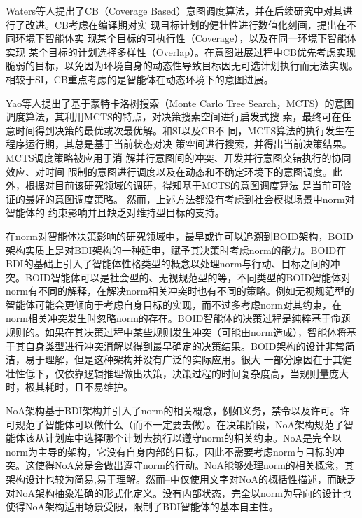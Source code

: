 Waters等人提出了CB（Coverage Based）意图调度算法\cite{DBLP:conf/atal/WatersPS14,DBLP:conf/aamas/ThangarajahSP12}，并在后续研究中对其进行了改进\cite{DBLP:journals/aamas/WatersPS15}。CB考虑在编译期对实 现目标计划的健壮性进行数值化刻画，提出在不同环境下智能体实 现某个目标的可执行性（Coverage），以及在同一环境下智能体实现 某个目标的计划选择多样性（Overlap）。在意图进展过程中CB优先考虑实现脆弱的目标，以免因为环境自身的动态性导致目标因无可选计划执行而无法实现。相较于SI，CB重点考虑的是智能体在动态环境下的意图进展。

Yao等人提出了基于蒙特卡洛树搜索（Monte Carlo Tree Search，MCTS）的意图调度算法\cite{yao2017robust,dblp:conf/ijDBLP:conf/ijcai/Yao20,DBLP:conf/atal/YaoL16,DBLP:conf/ecai/YaoLT14,DBLP:conf/aaai/YaoLT16,DBLP:conf/ecai/YaoLT16}，其利用MCTS的特点，对决策搜索空间进行启发式搜 索，最终可在任意时间得到决策的最优或次最优解。和SI以及CB不 同，MCTS算法的执行发生在程序运行期，其总是基于当前状态对决 策空间进行搜索，并得出当前决策结果。MCTS调度策略被应用于消 解并行意图间的冲突、开发并行意图交错执行的协同效应、对时间 限制的意图进行调度以及在动态和不确定环境下的意图调度。此外，根据对目前该研究领域的调研，得知基于MCTS的意图调度算法 是当前可验证的最好的意图调度策略。
然而，上述方法都没有考虑到社会模拟场景中norm对智能体的 约束影响并且缺乏对维持型目标的支持。

在norm对智能体决策影响的研究领域中，最早或许可以追溯到BOID架构\cite{DBLP:conf/agents/BroersenDHHT01}，BOID架构实质上是对BDI架构的一种延申，赋予其决策时考虑norm的能力。BOID在BDI的基础上引入了智能体性格类型的概念以处理norm与行动、目标之间的冲突。BOID智能体可以是社会型的、无视规范型的等，不同类型的BOID智能体对norm有不同的解释，在解决norm相关冲突时也有不同的策略。例如无视规范型的智能体可能会更倾向于考虑自身目标的实现，而不过多考虑norm对其约束，在norm相关冲突发生时忽略norm的存在。BOID智能体的决策过程是纯粹基于命题规则的。如果在其决策过程中某些规则发生冲突（可能由norm造成），智能体将基于其自身类型进行冲突消解以得到最早确定的决策结果。BOID架构的设计非常简洁，易于理解，但是这种架构并没有广泛的实际应用。很大 一部分原因在于其健壮性低下，仅依靠逻辑推理做出决策，决策过程的时间复杂度高，当规则量庞大时，极其耗时，且不易维护。

NoA\cite{DBLP:conf/ijcai/KollingbaumN03}架构基于BDI架构并引入了norm的相关概念，例如义务，禁令以及许可。许可规范了智能体可以做什么（而不一定要去做）。在决策阶段，NoA架构规范了智能体该从计划库中选择哪个计划去执行以遵守norm的相关约束。NoA是完全以norm为主导的架构，它没有自身内部的目标，因此不需要考虑norm与目标的冲突。这使得NoA总是会做出遵守norm的行动。NoA能够处理norm的相关概念，其架构设计也较为简易,易于理解。然而--中仅使用文字对NoA的概括性描述，而缺乏对NoA架构抽象准确的形式化定义。没有内部状态，完全以norm为导向的设计也使得NoA架构适用场景受限，限制了BDI智能体的基本自主性。


